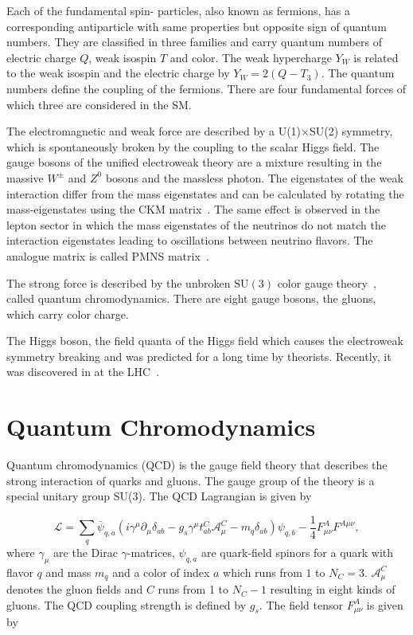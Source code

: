 Each of the fundamental spin- particles, also known as fermions,
has a corresponding antiparticle with same properties but opposite sign of
quantum numbers. They are classified in three families and carry quantum numbers
of electric charge $Q$, weak isospin $T$ and color. The weak hypercharge $Y_W$
is related to the weak isospin and the electric charge by $Y_W = 2(Q-T_3)$. The
quantum numbers define the coupling of the fermions. There are four fundamental
forces of which three are considered in the SM.

The electromagnetic and weak force are described by a U(1)$\times$SU(2)
symmetry, which is spontaneously broken by the coupling to the scalar Higgs
field. The gauge bosons of the unified electroweak theory are a mixture
resulting in the massive $W^\pm$ and $Z^0$ bosons and the massless photon. The
eigenstates of the weak interaction differ from the mass eigenstates and can be
calculated by rotating the mass-eigenstates using the CKM
matrix~\cite{Cabibbo:1963yz,Kobayashi:1973fv}. The same effect is observed in
the lepton sector in which the mass eigenstates of the neutrinos do not match
the interaction eigenstates leading to oscillations between neutrino flavors.
The analogue matrix is called PMNS matrix~\cite{Maki:1962mu,Pontecorvo:1957qd}.

The strong force is described by the unbroken $\mathrm{SU}(3)$ color gauge
theory~\cite{Zweig:1981pd,Fritzsch:1973pi}, called quantum chromodynamics. There
are eight gauge bosons, the gluons, which carry color charge. 

The Higgs boson, the field quanta of the Higgs field which causes the
electroweak symmetry breaking and was predicted for a long time by theorists.
Recently, it was discovered in at the LHC~\cite{Chatrchyan:2012xdj,Aad:2012tfa}.

\section{Quantum Chromodynamics}

Quantum chromodynamics (QCD) is the gauge field theory that describes the
strong interaction of quarks and gluons. The gauge group of the theory is a
special unitary group SU(3). The QCD Lagrangian is given by

\begin{equation*}
   \mathcal{L} = \sum_q \bar \psi_{q,a} \left( i \gamma^\mu \partial_\mu
   \delta_{ab} - g_s \gamma^\mu t_{ab}^C \mathcal{A}_{\mu}^C - m_q \delta_{ab}
   \right) \psi_{q,b} - \frac{1}{4} F_{\mu\nu}^{A} F^{A \mu\nu},
\end{equation*}
%
where $\gamma_\mu$ are the Dirac $\gamma$-matrices, $\psi_{q,a}$ are
quark-field spinors for a quark with flavor $q$ and mass $m_q$ and a color of
index $a$ which runs from $1$ to $N_C=3$. $\mathcal{A}_\mu^C$ denotes the gluon
fields and $C$ runs from 1 to $N_C-1$ resulting in eight kinds of gluons. The
QCD coupling strength is defined by $g_s$. The field tensor $F_{\mu\nu}^A$ is
given by

